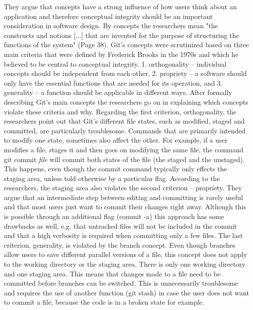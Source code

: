 \setlength{\parskip}{0em}
They argue that concepts have a strong influence of how users think about an application and therefore conceptual integrity should be an important consideration in software design. By concepts the researchers mean "the constructs and notions [...] that are invented for the purpose of structuring the functions of the system" (Page 38). Git's concepts were scrutinized based on three main criteria that were defined by Frederick Brooks in the 1970s \cite{brooks_mythical_1995} and which he believed to be central to conceptual integrity. 1. orthogonality – individual concepts should be independent from each other, 2. propriety – a software should only have the essential functions that are needed for its operation, and 3. generality – a function should be applicable in different ways. After formally describing Git's main concepts the researchers go on in explaining which concepts violate these criteria and why. Regarding the first criterion, orthogonality, the researchers point out that Git's different file states, such as modified, staged and committed, are particularly troublesome. Commands that are primarily intended to modify one state, sometimes also affect the other. For example, if a user modifies a file, stages it and then goes on modifying the same file, the command git commit \textit{file} will commit both states of the file (the staged and the unstaged). This happens, even though the commit command typically only effects the staging area, unless told otherwise by a particular flag.
According to the researchers, the staging area also violates the second criterion – propriety. They argue that an intermediate step between editing and committing is rarely useful and that most users just want to commit their changes right away. Although this is possible through an additional flag (commit -a) this approach has some drawbacks as well, e.g. that untracked files will not be included in the commit and that a high verbosity is required when committing only a few files.
The last criterion, generality, is violated by the branch concept. Even though branches allow users to save different parallel versions of a file, this concept does not apply to the working directory or the staging area. There is only one working directory and one staging area. This means that changes made to a file need to be committed before branches can be switched. This is unnecessarily troublesome and requires the use of another function (git stash) in case the user does not want to commit a file, because the code is in a broken state for example.

